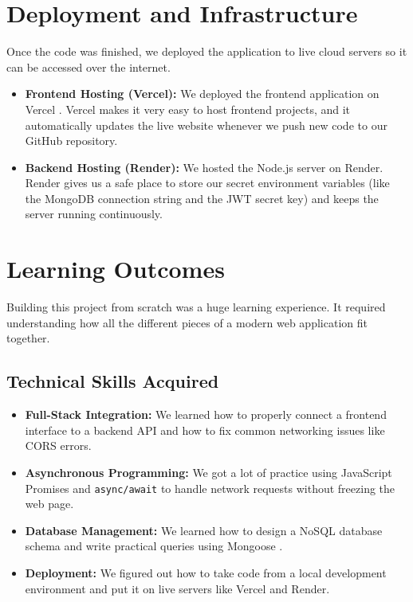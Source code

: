 \documentclass[conference]{IEEEtran}
\begin{document}
\section{Deployment and Infrastructure}
Once the code was finished, we deployed the application to live cloud servers so it can be accessed over the internet.

\begin{itemize}
\item \textbf{Frontend Hosting (Vercel):} We deployed the frontend application on Vercel \cite{b5}. Vercel makes it very easy to host frontend projects, and it automatically updates the live website whenever we push new code to our GitHub repository.
\item \textbf{Backend Hosting (Render):} We hosted the Node.js server on Render. Render gives us a safe place to store our secret environment variables (like the MongoDB connection string and the JWT secret key) and keeps the server running continuously.
\end{itemize}

\section{Learning Outcomes}
Building this project from scratch was a huge learning experience. It required understanding how all the different pieces of a modern web application fit together.

\subsection{Technical Skills Acquired}
\begin{itemize}
\item \textbf{Full-Stack Integration:} We learned how to properly connect a frontend interface to a backend API and how to fix common networking issues like CORS errors.
\item \textbf{Asynchronous Programming:} We got a lot of practice using JavaScript Promises and \texttt{async/await} to handle network requests without freezing the web page.
\item \textbf{Database Management:} We learned how to design a NoSQL database schema and write practical queries using Mongoose \cite{b3}.
\item \textbf{Deployment:} We figured out how to take code from a local development environment and put it on live servers like Vercel and Render.
\end{itemize}
\end{document}
